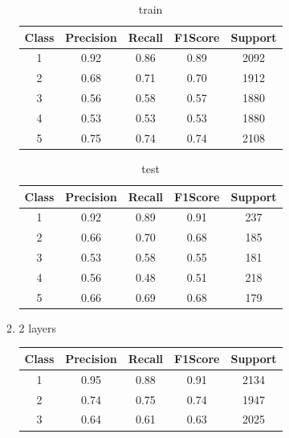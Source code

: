 \begin{enumerate}[label=(\alph*)]
\begin{enumerate}[label=\roman*.]
        \begin{table}[!htb]
            \centering
            \begin{tabular}{ccccc}
            \hline
            Class & Precision & Recall & F1Score & Support \\ \hline
            1     & 0.92      & 0.86   & 0.89    & 2092    \\
            2     & 0.68      & 0.71   & 0.70    & 1912    \\
            3     & 0.56      & 0.58   & 0.57    & 1880    \\
            4     & 0.53      & 0.53   & 0.53    & 1880    \\
            5     & 0.75      & 0.74   & 0.74    & 2108    \\ \hline
            \end{tabular}
            \caption{train}
            \label{part e train depth 1}
        \end{table}
        \begin{table}[!htb]
            \centering
            \begin{tabular}{ccccc}
            \hline
            Class & Precision & Recall & F1Score & Support \\ \hline
            1     & 0.92      & 0.89   & 0.91    & 237     \\
            2     & 0.66      & 0.70   & 0.68    & 185     \\
            3     & 0.53      & 0.58   & 0.55    & 181     \\
            4     & 0.56      & 0.48   & 0.51    & 218     \\
            5     & 0.66      & 0.69   & 0.68    & 179     \\ \hline
            \end{tabular}
            \caption{test}
            \label{part e test depth 1}
        \end{table}
        \newpage
        \item 2 layers
        \begin{table}[!htb]
            \centering
            \begin{tabular}{ccccc}
            \hline
            Class & Precision & Recall & F1Score & Support \\ \hline
            1     & 0.95      & 0.88   & 0.91    & 2134    \\
            2     & 0.74      & 0.75   & 0.74    & 1947    \\
            3     & 0.64      & 0.61   & 0.63    & 2025    \\

\end{tabular}
\end{table}
\end{enumerate}
\end{enumerate}
